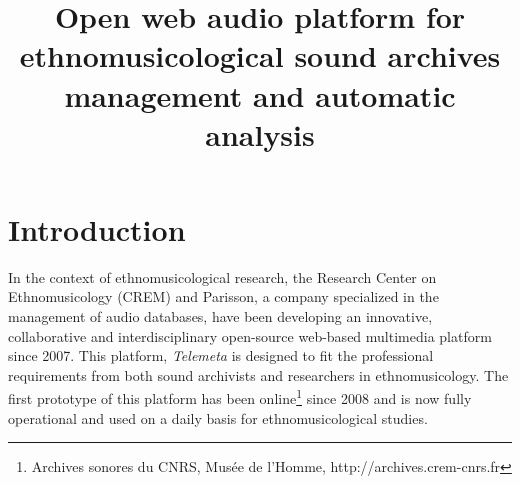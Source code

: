 \documentclass{paper}
\title{Open web audio platform for ethnomusicological sound archives management and automatic analysis}
\begin{document}
%
\maketitle
%



\section{Introduction}\label{sec:intro}


  In the context of ethnomusicological research, the Research Center on Ethnomusicology (CREM) and Parisson, a company specialized in the management of audio databases, have been developing an innovative, collaborative and interdisciplinary open-source web-based multimedia platform since 2007. 
This platform, \emph{Telemeta} is designed to fit the professional requirements from both sound archivists and researchers in ethnomusicology. The first prototype of this platform has been online\footnote{Archives sonores du CNRS, Musée de l'Homme, http://archives.crem-cnrs.fr} since 2008 and is now fully operational and used on a daily basis for ethnomusicological studies.
\end{document}
